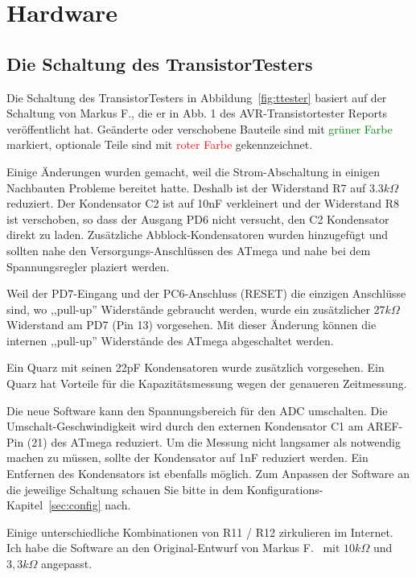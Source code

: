 \chapter{Hardware}

\section{Die Schaltung des TransistorTesters}
\label{sec:hardware}
Die Schaltung des TransistorTesters in Abbildung~\ref{fig:ttester} basiert auf der Schaltung von
Markus F., die er in Abb. 1 des AVR-Transistortester Reports \cite{Frejek} veröffentlicht hat.
Geänderte oder verschobene Bauteile sind mit \textcolor{green}{grüner Farbe} markiert, optionale Teile sind
mit \textcolor{red}{roter Farbe} gekennzeichnet.

Einige Änderungen wurden gemacht, weil die Strom-Abschaltung in einigen Nachbauten Probleme
bereitet hatte.
Deshalb ist der Widerstand R7 auf \(3.3k\Omega\) reduziert. 
Der Kondensator C2 ist auf 10nF verkleinert und der Widerstand R8 ist verschoben, so dass der
Ausgang PD6 nicht versucht, den C2 Kondensator direkt zu laden.
Zusätzliche Abblock-Kondensatoren wurden hinzugefügt und sollten nahe den Versorgungs-Anschlüssen
des ATmega und nahe bei dem Spannungsregler plaziert werden.

Weil der PD7-Eingang und der PC6-Anschluss (RESET) die einzigen Anschlüsse sind, wo
,,pull-up'' Widerstände gebraucht werden, wurde ein zusätzlicher \(27k\Omega\) Widerstand am PD7 (Pin 13) vorgesehen.
Mit dieser Änderung können die internen ,,pull-up'' Widerstände des ATmega abgeschaltet werden.

Ein Quarz mit seinen 22pF Kondensatoren wurde zusätzlich vorgesehen.
Ein Quarz hat Vorteile für die Kapazitätsmessung wegen der genaueren Zeitmessung.

Die neue Software kann den Spannungsbereich für den ADC umschalten. Die Um\-schalt-Ge\-schwin\-dig\-keit
wird durch den externen Kondensator C1 am AREF-Pin (21) des ATmega reduziert.
Um die Messung nicht langsamer als notwendig machen zu müssen, sollte der Kondensator auf
1nF reduziert werden. Ein Entfernen des Kondensators ist ebenfalls möglich.
Zum Anpassen der Software an die jeweilige Schaltung schauen Sie bitte in dem
Kon\-fi\-gura\-tions-Kapitel~\ref{sec:config} nach. 

Einige unterschiedliche Kombinationen von R11 / R12 zirkulieren im Internet.
Ich habe die Software an den Original-Entwurf von Markus F.~\cite{Frejek} mit \(10k\Omega\) und \(3,3k\Omega\) angepasst.

